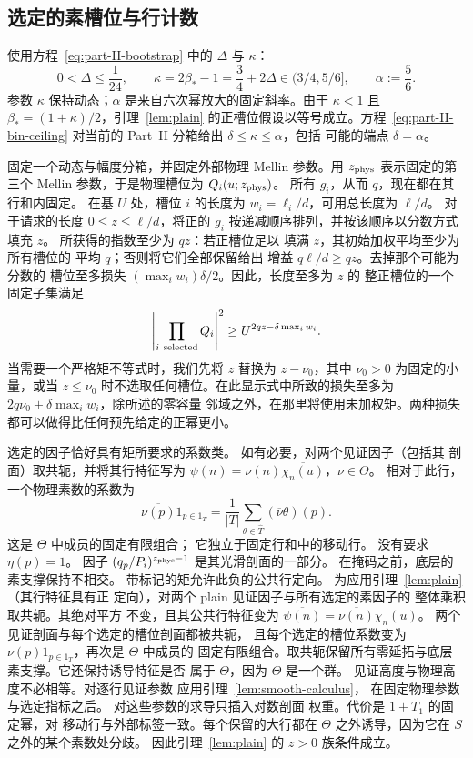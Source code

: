 \subsection{选定的素槽位与行计数}\label{sec:selection}

使用方程~\eqref{eq:part-II-bootstrap} 中的 \(\Delta\) 与 \(\kappa\)：
\[
 0<\Delta\le\frac1{24},\qquad
 \kappa=2\beta_*-1=\frac34+2\Delta\in(3/4,5/6],\qquad
 \alpha:=\frac56.
\]
参数 \(\kappa\) 保持动态；\(\alpha\) 是来自六次幂放大的固定斜率。由于 \(\kappa<1\) 且
\(\beta_*=(1+\kappa)/2\)，引理~\ref{lem:plain} 的正槽位假设以等号成立。方程~\eqref{eq:part-II-bin-ceiling}
对当前的 Part~II 分箱给出 \(\delta\le\kappa\le\alpha\)，包括
可能的端点 \(\delta=\alpha\)。

固定一个动态与幅度分箱，并固定外部物理
Mellin 参数。用 \(z_{\rm phys}\) 表示固定的第三个 Mellin
参数，于是物理槽位为 \(Q_i(u;z_{\rm phys})\)。
所有 \(g_i\)，从而 \(q\)，现在都在其行和内固定。
在基 \(U\) 处，槽位 \(i\) 的长度为
\(w_i=\ell_i/d\)，可用总长度为 \(\ell/d\)。
对于请求的长度 \(0\le z\le\ell/d\)，将正的
\(g_i\) 按递减顺序排列，并按该顺序以分数方式填充 \(z\)。
所获得的指数至少为 \(qz\)：若正槽位足以
填满 \(z\)，其初始加权平均至少为所有槽位的
平均 \(q\)；否则将它们全部保留给出
增益 \(q\ell/d\ge qz\)。去掉那个可能为分数的
槽位至多损失 \((\max_i w_i)\delta/2\)。因此，长度至多为 \(z\) 的
整正槽位的一个固定子集满足
\[
 \left|\prod_{i\ {\rm selected}}Q_i\right|^2
 \ge U^{2qz-\delta\max_iw_i}.
\]
当需要一个严格矩不等式时，我们先将 \(z\)
替换为 \(z-\nu_0\)，其中 \(\nu_0>0\) 为固定的小量，或当
\(z\le\nu_0\) 时不选取任何槽位。在此显示式中所致的损失至多为
\(2q\nu_0+\delta\max_iw_i\)，除所述的零容量
邻域之外，在那里将使用未加权矩。两种损失
都可以做得比任何预先给定的正幂更小。

选定的因子恰好具有矩所要求的系数类。
如有必要，对两个见证因子（包括其
剖面）取共轭，并将其行特征写为
\(\psi(n)=\nu(n)\overline{\chi_n(u)}\)，\(\nu\in\Theta\)。
相对于此行，一个物理素数的系数为
\[
 \overline{\nu(p)}1_{p\in1_T}
 =\frac1{|T|}\sum_{\theta\in\widehat T}
       (\overline{\nu}\theta)(p).
\]
这是 \(\Theta\) 中成员的固定有限组合；
它独立于固定行和中的移动行。
没有要求 \(\eta(p)=1\)。
因子 \((q_p/P_i)^{z_{\rm phys}-1}\) 是其光滑剖面的一部分。
在掩码之前，底层的素支撑保持不相交。
带标记的矩允许此负的公共行定向。
为应用引理~\ref{lem:plain}（其行特征具有正
定向），对两个 plain 见证因子与所有选定的素因子的
整体乘积取共轭。其绝对平方
不变，且其公共行特征变为
\(\overline{\psi(n)}=\overline{\nu(n)}\chi_n(u)\)。
两个见证剖面与每个选定的槽位剖面都被共轭，
且每个选定的槽位系数变为
\(\nu(p)1_{p\in1_T}\)，再次是 \(\Theta\) 中成员的
固定有限组合。取共轭保留所有零延拓与底层
素支撑。它还保持诱导特征是否
属于 \(\Theta\)，因为 \(\Theta\) 是一个群。
见证高度与物理高度不必相等。对逐行见证参数
应用引理~\ref{lem:smooth-calculus}，
在固定物理参数与选定指标之后。
对这些参数的求导只插入对数剖面
权重。代价是 \(1+T_1\) 的固定幂，对
移动行与外部标签一致。每个保留的大行都在
\(\Theta\) 之外诱导，因为它在 \(S\) 之外的某个素数处分歧。
因此引理~\ref{lem:plain} 的 \(z>0\) 族条件成立。

